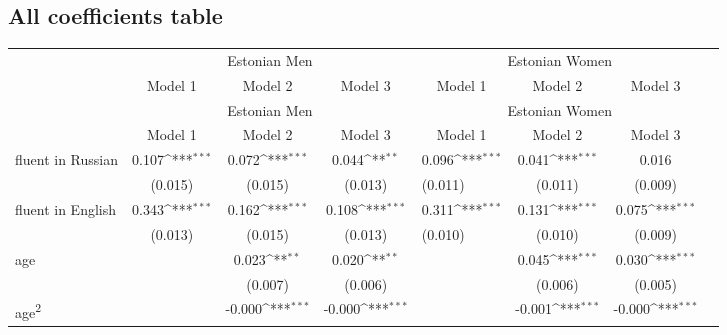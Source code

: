 \subsection{All coefficients table}
{
	\def\sym#1{\ifmmode^{#1}\else\(^{#1}\)\fi}
	\begin{longtable}{l*{3}{c}|l*{3}{c}}
		\toprule
		& \multicolumn{3}{c}{Estonian Men} & \multicolumn{3}{c}{Estonian Women} \\
				&\multicolumn{1}{c}{Model 1}&\multicolumn{1}{c}{Model 2}&\multicolumn{1}{c}{Model 3}&\multicolumn{1}{c}{Model 1}&\multicolumn{1}{c}{Model 2}&\multicolumn{1}{c}{Model 3}\\
		\endfirsthead
				& \multicolumn{3}{c}{Estonian Men} & \multicolumn{3}{c}{Estonian Women} \\
		&\multicolumn{1}{c}{Model 1}&\multicolumn{1}{c}{Model 2}&\multicolumn{1}{c}{Model 3}&\multicolumn{1}{c}{Model 1}&\multicolumn{1}{c}{Model 2}&\multicolumn{1}{c}{Model 3}\\
		\midrule
		\endhead
		\midrule
		\endfoot
		\endlastfoot
		\midrule
		fluent in Russian   &       0.107\sym{***}&       0.072\sym{***}&       0.044\sym{**} &       0.096\sym{***}&       0.041\sym{***}&       0.016         \\
		&     (0.015)         &     (0.015)         &     (0.013)         &     (0.011)         &     (0.011)         &     (0.009)         \\
		fluent in English   &       0.343\sym{***}&       0.162\sym{***}&       0.108\sym{***}&       0.311\sym{***}&       0.131\sym{***}&       0.075\sym{***}\\
		&     (0.013)         &     (0.015)         &     (0.013)         &     (0.010)         &     (0.010)         &     (0.009)         \\
		age                 &                     &       0.023\sym{**} &       0.020\sym{**} &                     &       0.045\sym{***}&       0.030\sym{***}\\
		&                     &     (0.007)         &     (0.006)         &                     &     (0.006)         &     (0.005)         \\
		age\textsuperscript{2}    &                     &      -0.000\sym{***}&      -0.000\sym{***}&                     &      -0.001\sym{***}&      -0.000\sym{***}\\

\end{longtable}}
